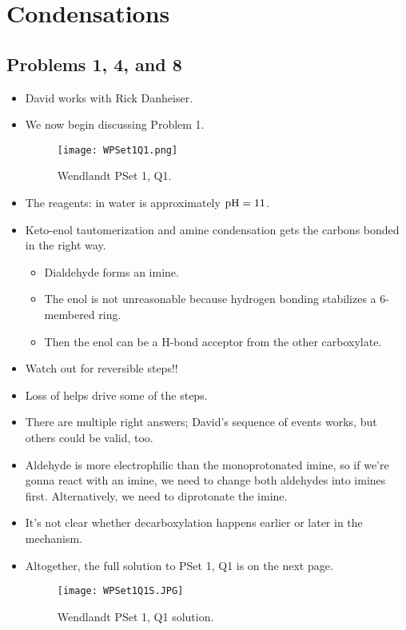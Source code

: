 \documentclass[../notes.tex]{subfiles}
\begin{document}
\chapter{Condensations}
\section{Problems 1, 4, and 8}
\begin{itemize}
    \item {}David works with Rick Danheiser.
    \item We now begin discussing Problem 1.
    \begin{figure}[h!]
        \centering
        \texttt{[image: WPSet1Q1.png]}
        \caption{Wendlandt PSet 1, Q1.}
        \label{fig:WPSet1Q1}
    \end{figure}
    \item The reagents:  in water is approximately $\textup{pH}=11$.
    \item Keto-enol tautomerization and amine condensation gets the carbons bonded in the right way.
    \begin{itemize}
        \item Dialdehyde forms an imine.
        \item The enol is not unreasonable because hydrogen bonding stabilizes a 6-membered ring.
        \item Then the enol can be a H-bond acceptor from the other carboxylate.
    \end{itemize}
    \item Watch out for reversible steps!!
    \item Loss of  helps drive some of the steps.
    \item There are multiple right answers; David's sequence of events works, but others could be valid, too.
    \item Aldehyde is more electrophilic than the monoprotonated imine, so if we're gonna react with an imine, we need to change both aldehydes into imines first. Alternatively, we need to diprotonate the imine.
    \item It's not clear whether decarboxylation happens earlier or later in the mechanism.
    \item Altogether, the full solution to PSet 1, Q1 is on the next page.
    \begin{figure}[H]
        \centering
        \texttt{[image: WPSet1Q1S.JPG]}
        \caption{Wendlandt PSet 1, Q1 solution.}

\end{figure}
\end{itemize}
\end{document}
